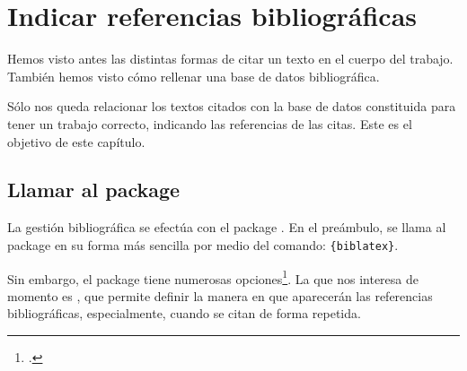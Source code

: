 \chapter{Indicar referencias bibliográficas}

\bibverbose

\begin{intro}
Hemos visto antes las distintas formas de citar un
texto en el cuerpo del trabajo. También hemos visto
cómo rellenar una base de datos bibliográfica.

Sólo nos queda relacionar los textos citados con la base de datos
constituida para tener un trabajo correcto, indicando las referencias
de las citas. Este es el objetivo de este capítulo.

\end{intro}


\section[Llamar al  package]{Llamar al package }

La gestión bibliográfica se efectúa con el  package
. En el preámbulo, se llama al package en su forma
más sencilla por medio del comando:
\verb|{biblatex}|.


Sin embargo, el  package tiene numerosas
opciones\footcite{biblatex_options}. La que nos interesa de momento es
, que permite definir la manera en que aparecerán
las referencias bibliográficas,  especialmente, cuando se citan de
forma repetida.

